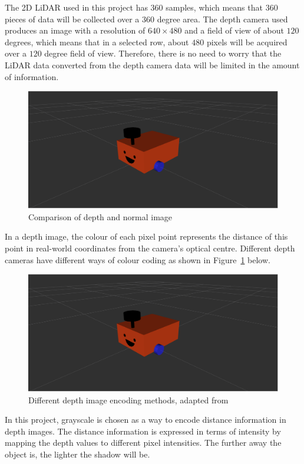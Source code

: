 The 2D LiDAR used in this project has $360$ samples, which means that $360$ pieces of data will be collected over a $360$ degree area. 
The depth camera used produces an image with a resolution of $640\times480$ and a field of view of about $120$ degrees, 
which means that in a selected row, about $480$ pixels will be acquired over a $120$ degree field of view. 
Therefore, there is no need to worry that the LiDAR data converted from the depth camera data will be limited in the amount of information.

\begin{figure}[H]
    \centering
    \includegraphics[width=0.8\linewidth]{figs/robot.png}
    \caption{Comparison of depth and normal image}
\end{figure}
In a depth image, the colour of each pixel point represents the distance of this point 
in real-world coordinates from the camera's optical centre. 
Different depth cameras have different ways of colour coding as shown in Figure~\ref{fig:depth_encoding} below.
\begin{figure}[H]
    \centering
    \includegraphics[width=0.8\linewidth]{figs/robot.png}
    \caption{Different depth image encoding methods, adapted from~\cite{depthencode}}
    \label{fig:depth_encoding}
\end{figure}
In this project, grayscale is chosen as a way to encode distance information in depth images. 
The distance information is expressed in terms of intensity by mapping the depth values to different pixel intensities.
The further away the object is, the lighter the shadow will be. 
